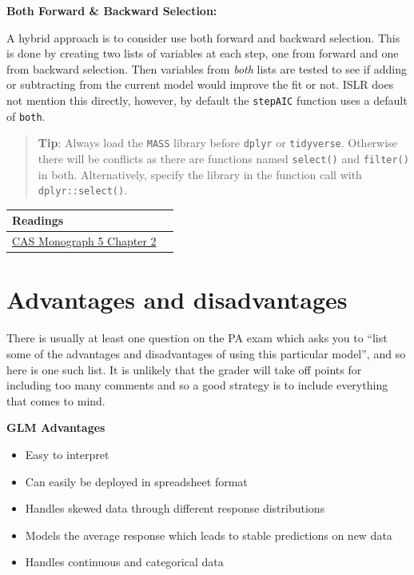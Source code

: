 \documentclass[openany]{book}
\providecommand{\tightlist}{%
  \setlength{\itemsep}{0pt}\setlength{\parskip}{0pt}}
\begin{document}
\textbf{Both Forward \& Backward Selection:}

A hybrid approach is to consider use both forward and backward selection. This is done by creating two lists of variables at each step, one from forward and one from backward selection. Then variables from \emph{both} lists are tested to see if adding or subtracting from the current model would improve the fit or not. ISLR does not mention this directly, however, by default the \texttt{stepAIC} function uses a default of \texttt{both}.

\begin{quote}
\textbf{Tip}: Always load the \texttt{MASS} library before \texttt{dplyr} or \texttt{tidyverse}. Otherwise there will be conflicts as there are functions named \texttt{select()} and \texttt{filter()} in both. Alternatively, specify the library in the function call with \texttt{dplyr::select()}.
\end{quote}

\begin{longtable}[]{@{}ll@{}}
\toprule
Readings &\tabularnewline
\midrule
\endhead
\href{https://www.casact.org/pubs/monographs/papers/05-Goldburd-Khare-Tevet.pdf}{CAS Monograph 5 Chapter 2} &\tabularnewline
\bottomrule
\end{longtable}

\hypertarget{advantages-and-disadvantages}{%
\section{Advantages and disadvantages}\label{advantages-and-disadvantages}}

There is usually at least one question on the PA exam which asks you to ``list some of the advantages and disadvantages of using this particular model'', and so here is one such list. It is unlikely that the grader will take off points for including too many comments and so a good strategy is to include everything that comes to mind.

\textbf{GLM Advantages}

\begin{itemize}
\tightlist
\item
  Easy to interpret
\item
  Can easily be deployed in spreadsheet format
\item
  Handles skewed data through different response distributions
\item
  Models the average response which leads to stable predictions on new data
\item
  Handles continuous and categorical data
\end{itemize}
\end{document}
